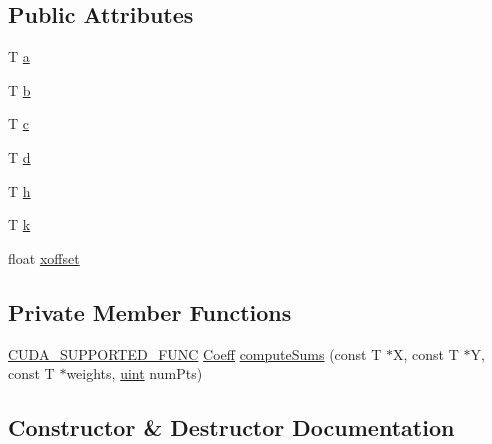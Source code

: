 \subsection*{Public Attributes}
\begin{DoxyCompactItemize}
\item 
T \hyperlink{class_lsq_sq_quad_fit_aed5761aec0a7a0f48c00668e07018f5f}{a}
\item 
T \hyperlink{class_lsq_sq_quad_fit_a2152e5451babc95de72e22235c506207}{b}
\item 
T \hyperlink{class_lsq_sq_quad_fit_a9339f928660fda5f1d67bbe93da0df5e}{c}
\item 
T \hyperlink{class_lsq_sq_quad_fit_a2fbec8bc8653a177da1f7d5db77a9c0a}{d}
\item 
T \hyperlink{class_lsq_sq_quad_fit_a6e53e031b4b75e7c5dba305b47eb3c42}{h}
\item 
T \hyperlink{class_lsq_sq_quad_fit_a73e23f026e8415f042ba540d2fbe2ab2}{k}
\item 
float \hyperlink{class_lsq_sq_quad_fit_aaa34bae332c501e7d18cca96fb51f403}{xoffset}
\end{DoxyCompactItemize}
\subsection*{Private Member Functions}
\begin{DoxyCompactItemize}
\item 
\hyperlink{gpu__utils_8h_a69f41cb6c15f0e34b0889a5f6d5aae32}{C\+U\+D\+A\+\_\+\+S\+U\+P\+P\+O\+R\+T\+E\+D\+\_\+\+F\+U\+NC} \hyperlink{struct_lsq_sq_quad_fit_1_1_coeff}{Coeff} \hyperlink{class_lsq_sq_quad_fit_aecc2223175fefa90ae424e9c6e5c36ec}{compute\+Sums} (const T $\ast$X, const T $\ast$Y, const T $\ast$weights, \hyperlink{std__incl_8h_a91ad9478d81a7aaf2593e8d9c3d06a14}{uint} num\+Pts)
\end{DoxyCompactItemize}


\subsection{Constructor \& Destructor Documentation}
